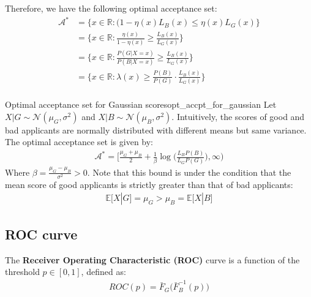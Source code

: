 \begin{proof*}
    \noindent Therefore, we have the following optimal acceptance set:
    \begin{align*}
        \mathcal{A}^* &= \Bigg\{
            x \in \mathbb{R} : (1 - \eta(x)L_B(x) \le \eta(x) L_G(x)
        \Bigg\} \\
        &= \Bigg\{
            x \in \mathbb{R} : \frac{\eta(x)}{1-\eta(x)} \ge \frac{L_B(x)}{L_G(x)}
        \Bigg\} \\
        &= \Bigg\{
            x \in \mathbb{R} : \frac{P(G|X=x)}{P(B|X=x)} \ge \frac{L_B(x)}{L_G(x)}
        \Bigg\} \\ 
        &= \Bigg\{
            x \in \mathbb{R} : \lambda(x) \ge \frac{P(B)}{P(G)}\cdot \frac{L_B(x)}{L_G(x)}
        \Bigg\} \\ 
    \end{align*}
\end{proof*}

\begin{proposition}{Optimal acceptance set for Gaussian scores}{opt_accpt_for_gaussian}
    Let $X|G\sim \mathcal{N}(\mu_G, \sigma^2)$ and $X|B \sim \mathcal{N}(\mu_B, \sigma^2)$. Intuitively, the scores of good and bad applicants are normally distributed with different means but same variance. The optimal acceptance set is given by:
    \begin{align*}
        \mathcal{A}^* = \Bigg[ 
            \frac{\mu_G + \mu_B}{2} + \frac{1}{\beta}\log\Bigg( 
                \frac{L_BP(B)}{L_GP(G)}
            \Bigg), \infty
        \Bigg)
    \end{align*}
    \noindent Where $\beta = \frac{\mu_G - \mu_B}{\sigma^2}>0$. Note that this bound is under the condition that the mean score of good applicants is strictly greater than that of bad applicants:
    \begin{align*}
        \mathbb{E}\Big[ X|G \Big] = \mu_G > \mu_B = \mathbb{E}\Big[ X|B \Big]
    \end{align*}
\end{proposition}

\subsection{ROC curve}
\begin{definition}
    The \textbf{Receiver Operating Characteristic (ROC)} curve is a function of the threshold $p \in [0,1]$, defined as:
    \begin{align*}
        \boxed{
            ROC(p) = \bar F_G\Big( \bar F_B^{-1}(p) \Big)
        }
    \end{align*}
\end{definition}

